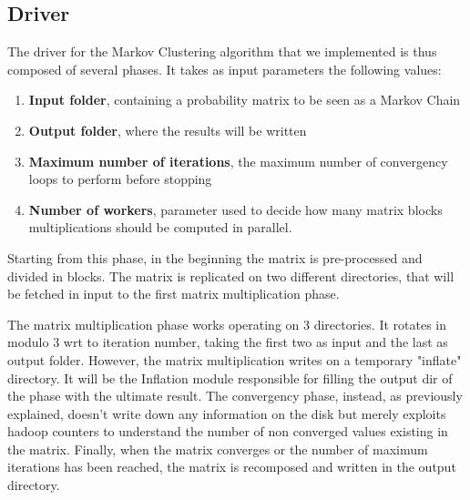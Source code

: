 \subsection{Driver}
The driver for the Markov Clustering algorithm that we implemented is thus composed of several phases.
It takes as input parameters the following values:
\begin{enumerate}
\item \textbf{Input folder}, containing a probability matrix to be seen as a Markov Chain
\item \textbf{Output folder}, where the results will be written
\item \textbf{Maximum number of iterations}, the maximum number of convergency loops to perform before stopping
\item \textbf{Number of workers}, parameter used to decide how many matrix blocks multiplications should be computed in parallel.
\end{enumerate}
Starting from this phase, in the beginning the matrix is pre-processed and divided in blocks. The matrix is replicated on two different directories, that will be fetched in input to the first matrix multiplication phase.

The matrix multiplication phase works operating on 3 directories. It rotates in modulo 3 wrt to iteration number, taking the first two as input and the last as output folder.
However, the matrix multiplication writes on a temporary "inflate" directory. It will be the Inflation module responsible for filling the output dir of the phase with the ultimate result.
The convergency phase, instead, as previously explained, doesn't write down any information on the disk but merely exploits hadoop counters to understand the number of non converged values existing in the matrix.
Finally, when the matrix converges or the number of maximum iterations has been reached, the matrix is recomposed and written in the output directory.

